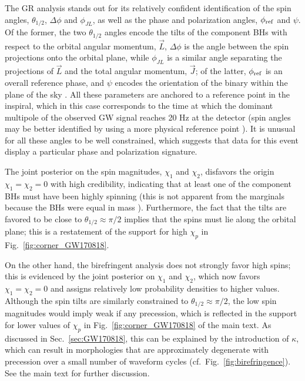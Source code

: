 \documentclass[aps,prd,twocolumn,superscriptaddress,preprintnumbers,nofootinbib]{revtex4-2}
\begin{document}
The GR analysis stands out for its relatively confident identification of the spin angles, $\theta_{1/2}$, $\Delta \phi$ and $\phi_{JL}$, as well as the phase and polarization angles, $\phi_{\rm ref}$ and $\psi$.
Of the former, the two $\theta_{1/2}$ angles encode the tilts of the component \acp{BH} with respect to the orbital angular momentum, $\vec{L}$, $\Delta \phi$ is the angle between the spin projections onto the orbital plane, while $\phi_{JL}$ is a similar angle separating the projections of $\vec{L}$ and the total angular momentum, $\vec{J}$;
of the latter, $\phi_{\rm ref}$ is an overall reference phase, and $\psi$ encodes the orientation of the binary within the plane of the sky \cite{Isi:2022mbx}.
All these parameters are anchored to a reference point in the inspiral, which in this case corresponds to the time at which the dominant multipole of the observed \ac{GW} signal reaches 20 Hz at the detector (spin angles may be better identified by using a more physical reference point \cite{Varma:2021csh}).
It is unusual for all these angles to be well constrained, which suggests that data for this event display a particular phase and polarization signature.

The joint posterior on the spin magnitudes, $\chi_1$ and $\chi_2$, disfavors the origin $\chi_1 = \chi_2 = 0$ with high credibility, indicating that at least one of the component \acp{BH} must have been highly spinning (this is not apparent from the marginals because the \acp{BH} were equal in mass \cite{Biscoveanu:2020are}).
Furthermore, the fact that the tilts are favored to be close to $\theta_{1/2} \approx \pi/2$ implies that the spins must lie along the orbital plane;
this is a restatement of the support for high $\chi_p$ in Fig.~\ref{fig:corner_GW170818}.

On the other hand, the birefringent analysis does not strongly favor high spins; this is evidenced by the joint posterior on $\chi_1$ and $\chi_2$, which now favors $\chi_1 = \chi_2 = 0$ and assigns relatively low probability densities to higher values.
Although the spin tilts are similarly constrained to $\theta_{1/2} \approx \pi/2$, the low spin magnitudes would imply weak if any precession, which is reflected in the support for lower values of $\chi_p$ in Fig.~\ref{fig:corner_GW170818} of the main text.
As discussed in Sec.~\ref{sec:GW170818}, this can be explained by the introduction of $\kappa$, which can result in morphologies that are approximately degenerate with precession over a small number of waveform cycles (cf.~Fig.~\ref{fig:birefringence}).
See the main text for further discussion.
\end{document}
